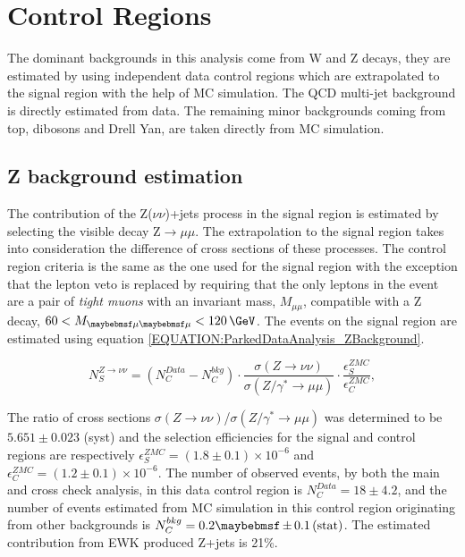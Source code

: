 \section{Control Regions}
\label{SECTION:ParkedDataAnalysis_ControlRegions}

The dominant backgrounds in this analysis come from W and Z decays, they are estimated by using independent data control regions which are extrapolated to the signal region with the help of \gls{MC} simulation. The \gls{QCD} multi-jet background is directly estimated from data. The remaining minor backgrounds coming from top, dibosons and Drell Yan, are taken directly from \gls{MC} simulation.

\subsection{Z background estimation}
\label{SECTION:ParkedDataAnalysis_ControlRegions_ZBackground}


The contribution of the Z($\nu\nu$)+jets process in the signal region is estimated by selecting the visible decay Z$\rightarrow\mu\mu$. The extrapolation to the signal region takes into consideration the difference of cross sections of these processes. The control region criteria is the same as the one used for the signal region with the exception that the lepton veto is replaced by requiring that the only leptons in the event are a pair of \textit{tight muons} with an invariant mass, $M_{\mu\mu}$, compatible with a Z decay, $60<M_{\mu\mu}<120\,\GeV$. The events on the signal region are estimated using equation \ref{EQUATION:ParkedDataAnalysis_ZBackground}.

\begin{equation}
N_{S}^{Z\rightarrow\nu\nu}=\left(N_{C}^{Data}-N_{C}^{bkg}\right) \cdot\frac{\sigma\left(Z\rightarrow\nu\nu\right)}{\sigma\left(Z/\gamma^{*}\rightarrow\mu\mu\right)}\cdot \frac{\epsilon_{S}^{ZMC}}{\epsilon_{C}^{ZMC}},
\label{EQUATION:ParkedDataAnalysis_ZBackground}
\end{equation}

The ratio of cross sections $\sigma(Z\rightarrow\nu\nu)$/$\sigma(Z/\gamma^{*}\rightarrow\mu\mu)$ was determined to be $5.651\pm 0.023$ (syst) and the selection efficiencies for the signal and control regions are respectively $\epsilon_{S}^{ZMC}=(1.8\pm 0.1) \times 10^{-6}$ and $\epsilon_{C}^{ZMC}=(1.2\pm 0.1) \times 10^{-6}$. The number of observed events, by both the main and cross check analysis, in this data control region is $N_{C}^{Data}=18\pm 4.2$, and the number of events estimated from \gls{MC} simulation in this control region originating from other backgrounds is $N_{C}^{bkg}=0.2 \pm 0.1 \stat$. The estimated contribution from \gls{EWK} produced Z+jets is 21\%. 

